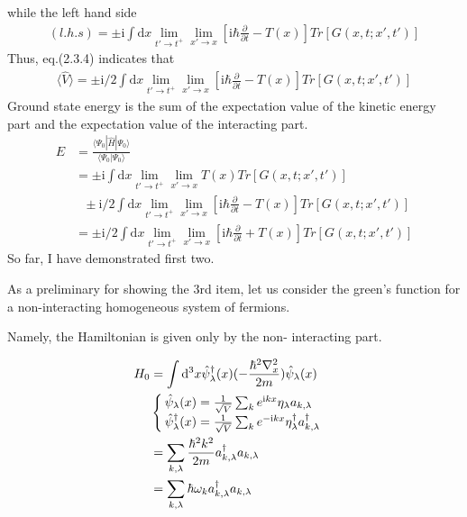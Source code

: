 while the left hand side
\begin{align}
(l.h.s)=\pm \mathrm{i} \int \mathrm{d}x \lim_{t' \rightarrow t^+} \lim_{x' \rightarrow x} [\mathrm{i}\hbar\frac{\partial}{\partial t}-T(x)] Tr[G(x,t;x',t')] \nonumber
\end{align}
Thus, eq.(2.3.4) indicates that 
\begin{align}
\langle \hat V\rangle=\pm \mathrm{i}/2 \int \mathrm{d}x \lim_{t' \rightarrow t^+} \lim_{x' \rightarrow x} [\mathrm{i}\hbar\frac{\partial}{\partial t}-T(x)] Tr[G(x,t;x',t')] \nonumber
\end{align}
Ground state energy is the sum of the expectation value of the kinetic energy part and the expectation value of the interacting part.
\begin{align}
E&=\frac{\langle\Psi_0|\hat H
|\Psi_0\rangle}{\langle\Psi_0|\Psi_0\rangle} \nonumber \\
&=\pm \mathrm{i} \int \mathrm{d}x \lim_{t' \rightarrow t^+} \lim_{x' \rightarrow x} T(x) Tr[G(x,t;x',t')]\nonumber \\
&\ \ \ \pm \mathrm{i}/2 \int \mathrm{d}x \lim_{t' \rightarrow t^+} \lim_{x' \rightarrow x} [\mathrm{i}\hbar\frac{\partial}{\partial t}-T(x)] Tr[G(x,t;x',t')] \nonumber\\
&=\pm \mathrm{i}/2 \int \mathrm{d}x \lim_{t' \rightarrow t^+} \lim_{x' \rightarrow x} [\mathrm{i}\hbar\frac{\partial}{\partial t}+T(x)] Tr[G(x,t;x',t')] \nonumber
\end{align}
So far, I have demonstrated first two.

As a preliminary for showing the 3rd item, let us consider the green's function for a non-interacting homogeneous system of fermions.

Namely, the Hamiltonian is given only by the non- interacting part.

\begin{align}
H_0&=\int \mathrm{d}^3x \hat\psi^{\dagger}_{\lambda}(x)(-\frac{\hbar^2\nabla^2_x}{2m})\hat\psi_{\lambda}(x)\nonumber \\
&
\begin{cases}
\hat\psi_{\lambda}(x)=\frac{1}{\sqrt{V}}\sum_{k}e^{\mathrm{i}kx}\eta_{\lambda}a_{k,\lambda} \cr
\hat\psi^{\dagger}_{\lambda}(x)=\frac{1}{\sqrt{V}}\sum_{k}e^{-\mathrm{i}kx}\eta_{\lambda}^{\dagger}a_{k,\lambda}^{\dagger}
\end{cases}\nonumber \\
&=\sum_{k,\lambda}\frac{\hbar^2k^2}{2m} a_{k,\lambda}^{\dagger}a_{k,\lambda} \nonumber \\
&=\sum_{k,\lambda}\hbar\omega_{k} a_{k,\lambda}^{\dagger}a_{k,\lambda} \nonumber
\end{align}

